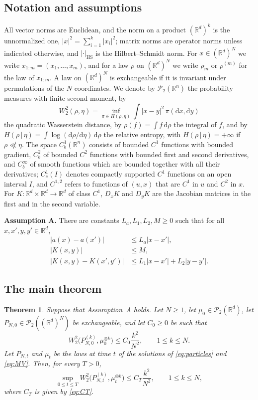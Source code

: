 \documentclass[11pt]{amsart}
\numberwithin{equation}{section}
\theoremstyle{plain}
\newtheorem{theorem}{Theorem}[section]
\theoremstyle{remark}
\newcommand{\R}{\mathbb{R}}
\newcommand{\cP}{\mathcal{P}}
\newcommand{\W}{W_2}
\newcommand{\HS}{\mathrm{HS}}
\newcommand{\dd}{\mathrm{d}}
\begin{document}
\subsection{Notation and assumptions}
All vector norms are Euclidean, and the norm on a product $(\R^d)^k$ is the unnormalized one, $|x|^2=\sum_{i=1}^k|x_i|^2$; matrix norms are operator norms unless indicated otherwise, and $|\cdot|_\HS$ is the Hilbert--Schmidt norm. For $x\in(\R^d)^N$ we write $x_{1:m}=(x_1,\dots,x_m)$, and for a law $\rho$ on $(\R^d)^N$ we write $\rho_m$ or $\rho^{(m)}$ for the law of $x_{1:m}$. A law on $(\R^d)^N$ is exchangeable if it is invariant under permutations of the $N$ coordinates. We denote by $\cP_2(\R^n)$ the probability measures with finite second moment, by
\[
\W^2(\rho,\eta)=\inf_{\pi\in\Pi(\rho,\eta)}\int|x-y|^2\,\pi(\dd x,\dd y)
\]
the quadratic Wasserstein distance, by $\rho(f)=\int f\,\dd\rho$ the integral of $f$, and by $H(\rho\,|\,\eta)=\int\log(\dd\rho/\dd\eta)\,\dd\rho$ the relative entropy, with $H(\rho\,|\,\eta)=+\infty$ if $\rho\not\ll\eta$. The space $C^1_b(\R^n)$ consists of bounded $C^1$ functions with bounded gradient, $C^2_b$ of bounded $C^2$ functions with bounded first and second derivatives, and $C^\infty_b$ of smooth functions which are bounded together with all their derivatives; $C^1_c(I)$ denotes compactly supported $C^1$ functions on an open interval $I$, and $C^{1,2}$ refers to functions of $(u,x)$ that are $C^1$ in $u$ and $C^2$ in $x$. For $K\colon\R^d\times\R^d\to\R^d$ of class $C^1$, $D_xK$ and $D_yK$ are the Jacobian matrices in the first and in the second variable.

\medskip
\noindent\textbf{Assumption A.} There are constants $L_a,L_1,L_2,M\ge0$ such that for all $x,x',y,y'\in\R^d$,
\begin{align}
|a(x)-a(x')|&\le L_a|x-x'|,\label{eq:A1}\\
|K(x,y)|&\le M,\label{eq:A2}\\
|K(x,y)-K(x',y')|&\le L_1|x-x'|+L_2|y-y'|.\label{eq:A3}
\end{align}

\subsection{The main theorem}

\begin{theorem}\label{thm:main}
Suppose that Assumption~A holds. Let $N\ge1$, let $\mu_0\in\cP_2(\R^d)$, let $P_{N,0}\in\cP_2((\R^d)^N)$ be exchangeable, and let $C_0\ge0$ be such that
\begin{equation}\label{eq:initial}
\W^2\big(P^{(k)}_{N,0},\mu_0^{\otimes k}\big)\le C_0\frac{k^2}{N^2},\qquad 1\le k\le N.
\end{equation}
Let $P_{N,t}$ and $\mu_t$ be the laws at time $t$ of the solutions of \eqref{eq:particles} and \eqref{eq:MV}. Then, for every $T>0$,
\begin{equation}\label{eq:conclusion}
\sup_{0\le t\le T}\W^2\big(P^{(k)}_{N,t},\mu_t^{\otimes k}\big)\le C_T\frac{k^2}{N^2},\qquad 1\le k\le N,
\end{equation}
where $C_T$ is given by \eqref{eq:CT}.
\end{theorem}
\end{document}
